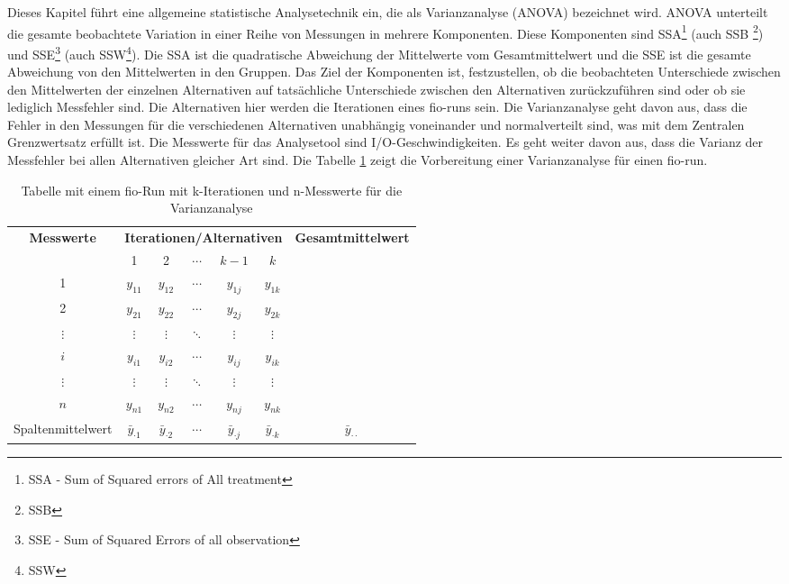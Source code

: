 Dieses Kapitel führt eine allgemeine statistische Analysetechnik ein, die als Varianzanalyse (ANOVA) bezeichnet wird. 
ANOVA unterteilt die gesamte beobachtete Variation in einer Reihe von Messungen in mehrere Komponenten.
Diese Komponenten sind SSA\footnote{SSA - Sum of Squared errors of All treatment} (auch SSB \footnote{SSB}) und SSE\footnote{SSE - Sum of Squared Errors of all observation}
 (auch SSW\footnote{SSW}).
Die SSA  ist die quadratische Abweichung der Mittelwerte vom Gesamtmittelwert und die SSE
ist die gesamte Abweichung von den Mittelwerten in den Gruppen.
Das Ziel der Komponenten ist, festzustellen, ob die beobachteten Unterschiede zwischen den Mittelwerten der einzelnen Alternativen auf tatsächliche 
Unterschiede zwischen den Alternativen zurückzuführen sind oder ob sie lediglich Messfehler sind.
Die Alternativen hier werden die Iterationen eines fio-runs sein.
Die Varianzanalyse geht davon aus, dass die Fehler in den Messungen für die verschiedenen Alternativen
unabhängig voneinander und normalverteilt sind, was mit dem Zentralen Grenzwertsatz erfüllt ist.
Die Messwerte für das Analysetool sind I/O-Geschwindigkeiten.
Es geht weiter davon aus, dass die Varianz der Messfehler bei allen Alternativen gleicher Art sind.
Die Tabelle \ref{tab:measurements} zeigt die Vorbereitung einer Varianzanalyse für einen fio-run.

\begin{table}[h!]
  \centering
  \begin{tabular}{|c|*{5}{c}|c|}
  \hline
  \textbf{Messwerte} & \multicolumn{5}{c|}{\textbf{Iterationen/Alternativen}} & \textbf{Gesamtmittelwert} \\
  \cline{2-6}
   & 1 & 2 & $\cdots$ & $k-1$ & $k$ & \\
  \hline
  1 & $y_{11}$ & $y_{12}$ & $\cdots$ & $y_{1j}$ & $y_{1k}$ & \\
  2 & $y_{21}$ & $y_{22}$ & $\cdots$ & $y_{2j}$ & $y_{2k}$ & \\
  $\vdots$ & $\vdots$ & $\vdots$ & $\ddots$ & $\vdots$ & $\vdots$ & \\
  $i$ & $y_{i1}$ & $y_{i2}$ & $\cdots$ & $y_{ij}$ & $y_{ik}$ & \\
  $\vdots$ & $\vdots$ & $\vdots$ & $\ddots$ & $\vdots$ & $\vdots$ & \\
  $n$ & $y_{n1}$ & $y_{n2}$ & $\cdots$ & $y_{nj}$ & $y_{nk}$ &  \\
  \hline
  Spaltenmittelwert & $\bar{y}_{\cdot1}$ & $\bar{y}_{\cdot2}$ & $\cdots$ & $\bar{y}_{\cdot j}$ & $\bar{y}_{\cdot k}$ & $\bar{y}_{\cdot \cdot}$ \\
  \hline
  \end{tabular}
  \caption{Tabelle mit einem fio-Run mit k-Iterationen und n-Messwerte für die Varianzanalyse}
  \label{tab:measurements}
\end{table}

